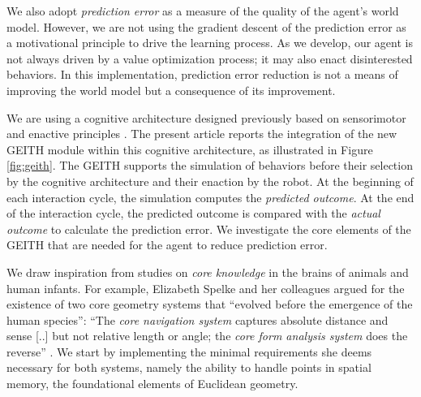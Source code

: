 \documentclass[runningheads]{llncs}
\begin{document}
We also adopt \textit{prediction error} as a measure of the quality of the agent's world model. %
However, we are not using the gradient descent of the prediction error as a motivational principle to drive the learning process. 
As we develop, our agent is not always driven by a value optimization process; it may also enact disinterested behaviors.
In this implementation, prediction error reduction is not a means of improving the world model but a consequence of its improvement.

We are using a cognitive architecture 
designed previously 
based on sensorimotor and enactive principles \cite{georgeon_artificial_2024}. 
The present article reports the integration of the new GEITH module within this cognitive architecture, as illustrated in Figure \ref{fig:geith}. 
The GEITH supports the simulation of behaviors before their selection by the cognitive architecture and their enaction by the robot. 
At the beginning of each interaction cycle, the simulation computes the \textit{predicted outcome}.
At the end of the interaction cycle, the predicted outcome is compared with the \textit{actual outcome} to calculate the prediction error.   
We investigate the core elements of the GEITH that are needed for the agent to reduce prediction error. 

We draw inspiration from studies on \textit{core knowledge} in the brains of animals and human infants. 
For example, Elizabeth Spelke and her colleagues argued for the existence of two core geometry systems that ``evolved before the emergence of the human species'':  
``The \textit{core navigation system} captures absolute distance and sense [..] but not relative length or angle; the \textit{core form analysis system} does the reverse'' \cite[p. 2789]{spelke_core_2012}.
We start by implementing the minimal requirements she deems necessary for both systems, namely the ability to handle points in spatial memory, the foundational elements of Euclidean geometry. 
\end{document}
